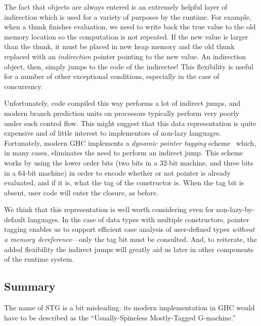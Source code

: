 The fact that objects are always entered is an extremely helpful layer
of indirection which is used for a variety of purposes by the runtime.
For example, when a thunk finishes evaluation, we need to write back the
true value to the old memory location so the computation is not
repeated.  If the new value is larger than the thunk, it must be placed
in new heap memory and the old thunk replaced with an \emph{indirection}
pointer pointing to the new value.  An indirection object, then, simply
jumps to the code of the indirectee!  This flexibility is useful for a
number of other exceptional conditions, especially in the case of
concurrency.

Unfortunately, code compiled this way performs a lot of indirect jumps,
and modern branch prediction units on processors typically perform very
poorly under such control flow.  This might suggest that this data
representation is quite expensive and of little interest to implementors
of non-lazy languages.  Fortunately, modern GHC implements a
\emph{dynamic pointer tagging} scheme~\XXX{} which, in many cases,
eliminates the need to perform an indirect jump.  This scheme works by
using the lower order bits (two bits in a 32-bit machine, and three bits
in a 64-bit machine) in order to encode whether or not pointer is
already evaluated, and if it is, what the tag of the constructor is.
When the tag bit is absent, user code will enter the closure, as before.

We think that this representation is well worth considering even for
non-lazy-by-default languages.  In the case of data types with multiple
constructors, pointer tagging enables us to support efficient case
analysis of user-defined types \emph{without a memory
dereference}---only the tag bit must be consulted.  And, to reiterate,
the added flexibility the indirect jumps will greatly aid us later in
other components of the runtime system.


\subsection{Summary}


The name of STG is a bit misleading: its modern implementation in GHC
would have to be described as the ``Usually-Spineless Mostly-Tagged
G-machine.''
